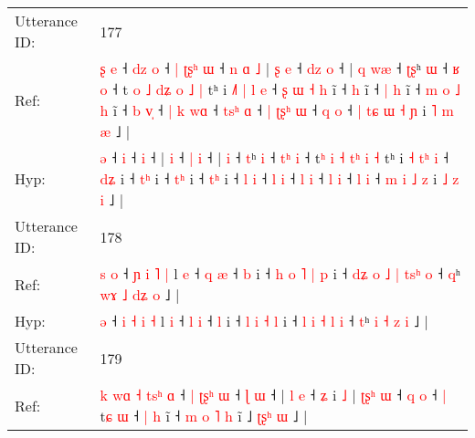 \documentclass[10pt]{article}
\DeclareRobustCommand{\hl}[1]{{\textcolor{red}{#1}}}
\begin{document}
\begin{longtable}{ll}
 \\
\midrule
Utterance ID: & 177 \\
Ref: & \hl{ʂ}\hl{ }\hl{e} ˧\hl{ }\hl{d}\hl{z} \hl{o} ˧\hl{ }\hl{|}\hl{ }\hl{ʈ}\hl{ʂ}\hl{ʰ} \hl{ɯ} ˧\hl{ }\hl{n}\hl{ }\hl{ɑ}\hl{ }\hl{˩} |\hl{ }\hl{ʂ} \hl{e} ˧ \hl{d}\hl{z} \hl{o} ˧ |\hl{ }\hl{q} \hl{w}\hl{æ} ˧ \hl{ʈ}\hl{ʂ}ʰ \hl{ɯ} ˧ \hl{}\hl{ʁ} \hl{o} ˧ t\hl{ }\hl{o} \hl{˩} \hl{d}\hl{ʑ}\hl{ }\hl{o} \hl{˩} \hl{|} tʰ i \hl{˩}\hl{˥} \hl{|}\hl{ }\hl{l} \hl{e} ˧\hl{ }\hl{ʂ}\hl{ }\hl{ɯ} \hl{˧}\hl{ }\hl{h} i\hl{̃} ˧ \hl{}\hl{h} i\hl{̃} ˧ \hl{|}\hl{ }\hl{h} i\hl{̃} ˧\hl{ }\hl{m}\hl{ }\hl{o} \hl{˩}\hl{ }\hl{h} i\hl{̃} ˧ \hl{b} \hl{v}\hl{̩} ˧\hl{ }\hl{|} \hl{k} \hl{w}\hl{ɑ} ˧ \hl{t}\hl{s}\hl{ʰ} \hl{ɑ} ˧\hl{ }\hl{|} \hl{ʈ}\hl{ʂ}\hl{ʰ} \hl{ɯ} ˧ \hl{q} \hl{o} ˧\hl{ }\hl{|} \hl{t}\hl{ɕ} \hl{ɯ} \hl{˧} \hl{ɲ} i \hl{˥} \hl{m} \hl{æ} ˩ |
 \\
Hyp: & \hl{}\hl{}\hl{ə} ˧\hl{}\hl{}\hl{} \hl{i} ˧\hl{}\hl{}\hl{}\hl{}\hl{}\hl{} \hl{i} ˧\hl{}\hl{}\hl{}\hl{}\hl{}\hl{} |\hl{}\hl{} \hl{i} ˧ \hl{}\hl{|} \hl{i} ˧ |\hl{}\hl{} \hl{}\hl{i} ˧ \hl{}\hl{t}ʰ \hl{i} ˧ \hl{t}\hl{ʰ} \hl{i} ˧ t\hl{}\hl{ʰ} \hl{i} \hl{˧}\hl{ }\hl{t}\hl{ʰ} \hl{i} \hl{˧} tʰ i \hl{}\hl{˧} \hl{}\hl{t}\hl{ʰ} \hl{i} ˧\hl{}\hl{}\hl{}\hl{} \hl{}\hl{d}\hl{ʑ} i\hl{} ˧ \hl{t}\hl{ʰ} i\hl{} ˧ \hl{}\hl{t}\hl{ʰ} i\hl{} ˧\hl{}\hl{}\hl{}\hl{} \hl{}\hl{t}\hl{ʰ} i\hl{} ˧ \hl{l} \hl{}\hl{i} ˧\hl{}\hl{} \hl{l} \hl{}\hl{i} ˧ \hl{}\hl{}\hl{l} \hl{i} ˧\hl{}\hl{} \hl{}\hl{}\hl{l} \hl{i} ˧ \hl{l} \hl{i} ˧\hl{}\hl{} \hl{}\hl{m} \hl{i} \hl{˩} \hl{z} i \hl{˩} \hl{z} \hl{i} ˩ |
 \\
\midrule
Utterance ID: & 178 \\
Ref: & \hl{s}\hl{ }\hl{o} ˧ \hl{ɲ} \hl{i} \hl{˥} \hl{|} l \hl{e} ˧ \hl{q} \hl{æ} ˧ \hl{b} i ˧\hl{ }\hl{h} \hl{o} \hl{˥} \hl{|} \hl{p} i ˧\hl{ }\hl{d}\hl{ʑ} \hl{o} \hl{˩} \hl{|} \hl{t}\hl{s}\hl{ʰ} \hl{o} ˧ \hl{q}ʰ \hl{w}\hl{ɤ} \hl{˩} \hl{d}\hl{ʑ} \hl{o} ˩ |
 \\
Hyp: & \hl{}\hl{}\hl{ə} ˧ \hl{i} \hl{˧} \hl{i} \hl{˧} l \hl{i} ˧ \hl{l} \hl{i} ˧ \hl{l} i ˧\hl{}\hl{} \hl{l} \hl{i} \hl{˧} \hl{l} i ˧\hl{}\hl{}\hl{} \hl{l} \hl{i} \hl{˧} \hl{}\hl{}\hl{l} \hl{i} ˧ \hl{t}ʰ \hl{}\hl{i} \hl{˧} \hl{}\hl{z} \hl{i} ˩ |
 \\
\midrule
Utterance ID: & 179 \\
Ref: & \hl{k}\hl{ }\hl{w}\hl{ɑ}\hl{ }\hl{˧}\hl{ }\hl{t}\hl{s}\hl{ʰ}\hl{ }\hl{ɑ} ˧\hl{ }\hl{|}\hl{ }\hl{ʈ}\hl{ʂ}\hl{ʰ} \hl{ɯ} ˧\hl{ }\hl{ɭ} \hl{ɯ} ˧ |\hl{ }\hl{l} \hl{e} ˧ \hl{ʑ} i \hl{˩} |\hl{ }\hl{ʈ}\hl{ʂ}\hl{ʰ} \hl{ɯ} ˧ \hl{q} \hl{o} ˧\hl{ }\hl{|} t\hl{ɕ} \hl{ɯ} ˧ \hl{|}\hl{ }\hl{h} i\hl{̃} ˧\hl{ }\hl{m}\hl{ }\hl{o} \hl{˥}\hl{ }\hl{h} i\hl{̃} ˩ \hl{ʈ}\hl{ʂ}\hl{ʰ} \hl{ɯ} ˩ |

\end{longtable}
\end{document}
